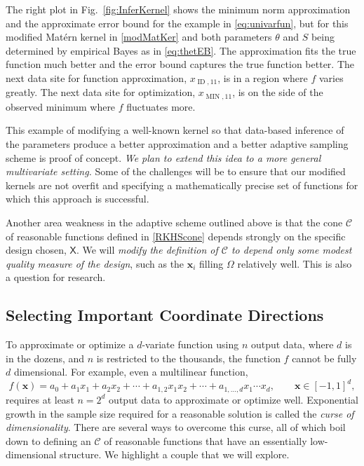\documentclass[11pt]{NSFamsart}
\DeclareMathOperator{\MIN}{MIN}
\DeclareMathOperator{\ID}{ID}
\newcommand{\mX}{\mathsf{X}}
\newcommand{\bx}{{\boldsymbol{x}}}
\newcommand{\calc}{{\mathcal{C}}}
\begin{document}
The right plot in Fig.\ \ref{fig:InferKernel} shows the minimum norm approximation and the approximate error bound for the example in \eqref{eq:univarfun}, but for this modified Mat\'ern kernel in \eqref{modMatKer} and both parameters $\theta$ and $S$ being determined by empirical Bayes as in \eqref{eq:thetEB}.  The approximation fits the true function much better and the error bound captures the true function better.  The next data site for function approximation, $x_{\ID,11}$, is in a region where $f$ varies greatly.  The next data site for optimization, $x_{\MIN,11}$,  is on the side of the observed minimum where $f$ fluctuates more.

This example of modifying a well-known kernel so that data-based inference of the parameters produce a better approximation and a better adaptive sampling scheme is proof of concept. \emph{ We plan to extend this idea to a more general multivariate setting.}  Some of the challenges will be to ensure that our modified kernels are not overfit and specifying a mathematically precise set of functions for which this approach is successful.

Another area weakness in the adaptive scheme outlined above is that the cone $\calc$ of reasonable functions defined in  \eqref{RKHScone} depends strongly on the specific design chosen, $\mX$.  We will \emph{modify the definition of $\calc$ to depend only some modest quality measure of the design}, such as the $\bx_i$ filling  $\Omega$ relatively well.  This is also a question for research.

\subsection{Selecting Important Coordinate Directions} \label{sec:selectCoord}

To approximate or optimize a $d$-variate function using $n$ output data, where $d$ is in the dozens, and $n$ is restricted to the thousands, the function $f$ cannot be fully $d$ dimensional.  For example, even a multilinear function,
\begin{equation*}
    f(\bx) = a_0 + a_1 x_1 + a_2 x_2 + \cdots + a_{1,2} x_1 x_2 + \cdots + a_{1,\ldots, d}x_1 \cdots x_d, \qquad \bx \in [-1,1]^d,
\end{equation*}
requires at least $n = 2^d$ output data to approximate or optimize well.  Exponential growth in the sample size required for a reasonable solution is called the \emph{curse of dimensionality}.  There are several ways to overcome this curse, all of which boil down to defining an $\calc$ of reasonable functions that have an essentially low-dimensional structure.  We highlight a couple that we will explore.
\end{document}
